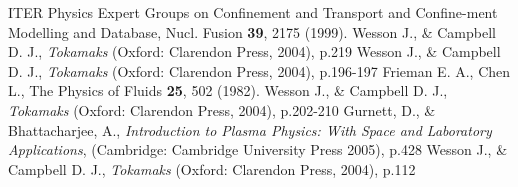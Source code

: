 \documentclass[12pt]{article}
\numberwithin{equation}{section}
\begin{document}
\begin{thebibliography}{0}
   
    ITER Physics Expert Groups on Confinement and Transport and Confine-ment Modelling and Database, Nucl. Fusion \textbf{39}, 2175 (1999).
    Wesson J., \& Campbell D. J., \textit{Tokamaks} (Oxford: Clarendon Press, 2004), p.219
    Wesson J., \& Campbell D. J., \textit{Tokamaks} (Oxford: Clarendon Press, 2004), p.196-197
    Frieman E. A., Chen L., The Physics of Fluids \textbf{25}, 502 (1982).
    Wesson J., \& Campbell D. J., \textit{Tokamaks} (Oxford: Clarendon Press, 2004), p.202-210
    Gurnett, D., \& Bhattacharjee, A., \textit{Introduction to Plasma Physics: With Space and Laboratory Applications}, (Cambridge: Cambridge University Press 2005), p.428
    Wesson J., \& Campbell D. J., \textit{Tokamaks} (Oxford: Clarendon Press, 2004), p.112
	
\end{thebibliography}
    
\end{document}
